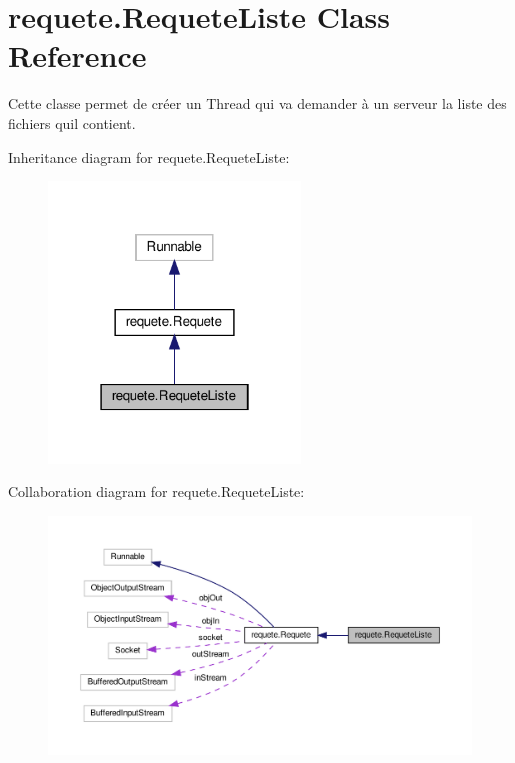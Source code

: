 \hypertarget{classrequete_1_1RequeteListe}{}\section{requete.\+Requete\+Liste Class Reference}
\label{classrequete_1_1RequeteListe}


Cette classe permet de créer un Thread qui va demander à un serveur la liste des fichiers qu\textquotesingle{}il contient.  




Inheritance diagram for requete.\+Requete\+Liste\+:\nopagebreak
\begin{figure}[H]
\begin{center}
\leavevmode
\includegraphics[width=190pt]{classrequete_1_1RequeteListe__inherit__graph}
\end{center}
\end{figure}


Collaboration diagram for requete.\+Requete\+Liste\+:\nopagebreak
\begin{figure}[H]
\begin{center}
\leavevmode
\includegraphics[width=350pt]{classrequete_1_1RequeteListe__coll__graph}
\end{center}
\end{figure}
